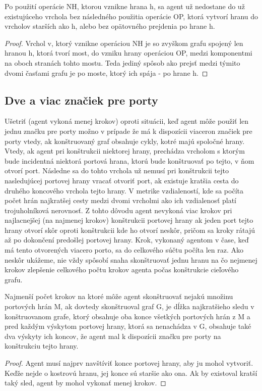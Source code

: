 \begin{lem}
Po použití operácie NH, ktorou vznikne hrana h, sa agent už nedostane do
už existujúceho vrchola bez následného použitia
operácie OP, ktorá vytvorí hranu do vrcholov starších ako h,
alebo bez opätovného prejdenia po hrane h.
\end{lem}
\begin{proof}
Vrchol v, ktorý vznikne operáciou NH je so zvyškom grafu spojený len hranou
h, ktorá tvorí most, do vzniku hrany operáciou OP, medzi komponentmi na oboch
stranách tohto mostu. Teda jediný spôsob ako prejsť medzi týmito dvomi
časťami grafu je po moste, ktorý ich spája - po hrane h.
\end{proof}



\subsection{Dve a viac značiek pre porty}
Ušetriť (agent vykoná menej krokov) oproti situácii, 
keď agent môže použiť len jednu značku pre porty
možno v prípade že má k dispozícii viaceron značiek pre porty vtedy,
 ak konštruovaný graf obsahuje cykly, kotré majú spoločné hrany.
Vtedy, ak agent pri konštrukcii niektorej hrany, 
prechádza vrcholom s ktorým bude incidentná niektorá
portová
hrana, ktorú bude konštruovať po tejto,
 v ňom otvorí port. Následne sa do tohto vrchola už nemusí pri konštrukcii
tejto nasledujúcej portovej hrany vracať otvoriť port, ak existuje
kratšia cesta do druhého koncového vrchola tejto hrany. V metrike
vzdialeností, kde sa počíta počet hrán najkratšej cesty medzi dvomi vrcholmi
ako ich vzdialenosť platí trojuholníková nerovnosť. Z tohto dôvodu agent
nevykoná viac krokov pri najlacnejšej (na najmenej krokov) 
konštrukcii portovej hrany ak jeden port tejto hrany otvorí skôr oproti
konštrukcii kde ho otvorí neskôr, pričom sa kroky rátajú až po dokončení
predošlej portovej hrany. Krok, vykonaný agentom v čase, keď má tento
otvorených viacero porto, sa do celkového súčtu počíta len raz.
Ako neskôr ukážeme, nie vždy spôsobí snaha skonštruovať jednu hranu na čo
nejmenej krokov zlepšenie celkového počtu krokov agenta počas konštrukcie
cieľového grafu.

\begin{lem}
Najmenší počet krokov na ktoré môže agent skonštruovať nejakú množinu
portových hrán M, ak dovtedy skonštruoval graf G, je dĺžka najkratšieho
sledu v konštruovanom grafe, ktorý obsahuje oba konce všetkých portových hrán
z M a pred každým výskytom portovej hrany, ktorá sa nenachádza v G, obsahuje
také dva výskyty ich koncov, že agent mal k dispozícii značku pre porty na
konštrukciu tejto hrany.
\end{lem}
\begin{proof}
Agent musí najprv navštíviť konce portovej hrany, aby ju mohol vytvoriť.
Keďže nejde o kostrovú hranu, jej konce sú staršie ako ona. Ak by existoval
kratší taký sled, agent by mohol vykonať menej krokov.
\end{proof}



